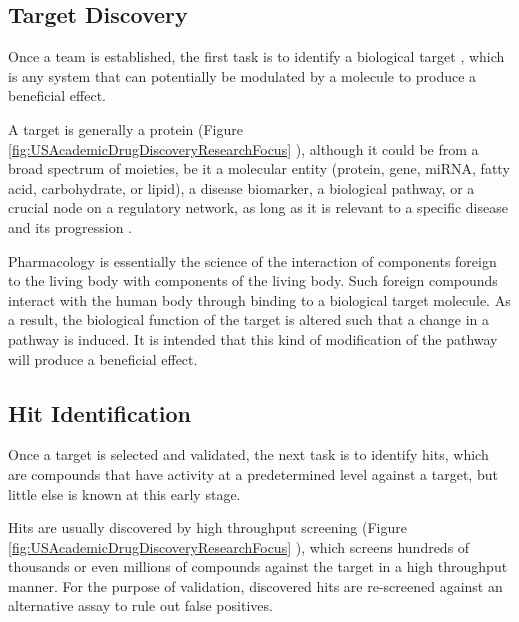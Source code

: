 \subsection{Target Discovery}

Once a team is established, the first task is to identify a biological target \citep{706,355,356,357,797}, which is any system that can potentially be modulated by a molecule to produce a beneficial effect.

A target is generally a protein (Figure \ref{fig:USAcademicDrugDiscoveryResearchFocus} \citep{721}), although it could be from a broad spectrum of moieties, be it a molecular entity (protein, gene, miRNA, fatty acid, carbohydrate, or lipid), a disease biomarker, a biological pathway, or a crucial node on a regulatory network, as long as it is relevant to a specific disease and its progression \citep{711}.

Pharmacology is essentially the science of the interaction of components foreign to the living body with components of the living body. Such foreign compounds interact with the human body through binding to a biological target molecule. As a result, the biological function of the target is altered such that a change in a pathway is induced. It is intended that this kind of modification of the pathway will produce a beneficial effect.

\subsection{Hit Identification}

Once a target is selected and validated, the next task is to identify hits, which are compounds that have activity at a predetermined level against a target, but little else is known at this early stage.

Hits are usually discovered by high throughput screening \citep{795,504,736} (Figure \ref{fig:USAcademicDrugDiscoveryResearchFocus} \citep{721}), which screens hundreds of thousands or even millions of compounds against the target in a high throughput manner. For the purpose of validation, discovered hits are re-screened against an alternative assay to rule out false positives.


